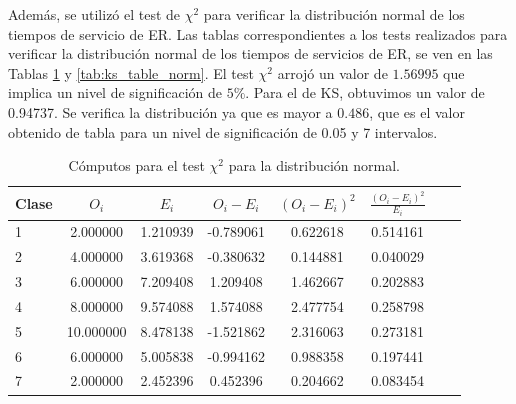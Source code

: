 \documentclass[a4paper,10pt]{article}
\begin{document}

Además, se utilizó el test de $\chi^2$ para verificar la distribución normal de los tiempos de servicio de ER. Las tablas correspondientes a los tests realizados para verificar la distribución normal de los tiempos de servicios de ER, se ven en las Tablas \ref{tab:chi_table_norm} y \ref{tab:ks_table_norm}. El test $\chi^2$ arrojó un valor de $1.56995$ que implica un nivel de significación de $5\%$. Para el de KS, obtuvimos un valor de 0.94737. Se verifica la distribución ya que es mayor a $0.486$, que es el valor obtenido de tabla para un nivel de significación de 0.05 y 7 intervalos.


\begin{table}[ht]
\begin{center}
\begin{tabular}{l*{6}{c}r}
\hline
Clase& $O_i$ & $E_i$  & $O_i - E_i$ & $(O_i - E_i)^2$ & $\frac{(O_i - E_i)^2}{E_i}$\\
\hline
1&2.000000&1.210939&-0.789061&0.622618&0.514161\\
2&4.000000&3.619368&-0.380632&0.144881&0.040029\\
3&6.000000&7.209408&1.209408&1.462667&0.202883\\
4&8.000000&9.574088&1.574088&2.477754&0.258798\\
5&10.000000&8.478138&-1.521862&2.316063&0.273181\\
6&6.000000&5.005838&-0.994162&0.988358&0.197441\\
7&2.000000&2.452396&0.452396&0.204662&0.083454\\
\hline
\end{tabular}
\caption{\label{tab:chi_table_norm} Cómputos para el test $\chi^2$ para la distribución normal.}
\end{center}
\end{table}
\end{document}
